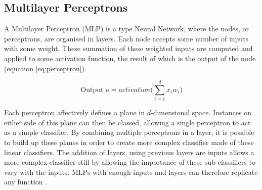 \subsection{Multilayer Perceptrons}
A Multilayer Perceptron (MLP) is a type Neural Network, where the nodes, or perceptrons, are organised in layers. Each node accepts some number of inputs with some weight. These summation of these weighted inputs are computed and applied to some activation function, the result of which is the output of the node (equation \ref{eq:perceptron}).

\begin{equation}
\label{eq:perceptron}
\text{Output } o = activation\bigg(\sum_{i=1}^{d}{x_iw_i}\bigg) 
\end{equation}

Each perceptron affectively defines a plane in $d$-dimensional space. Instances on either side of this plane can then be classed, allowing a single perceptron to act as a simple classifier. By combining multiple perceptrons in a layer, it is possible to build up these planes in order to create more complex classifier made of these linear classifiers. The addition of layers, using previous layers are inputs allows a more complex classifier still by allowing the importance of these sub-classifiers to vary with the inputs. MLPs with enough inputs and layers can therefore replicate any function \cite{baum1988capabilities}.


